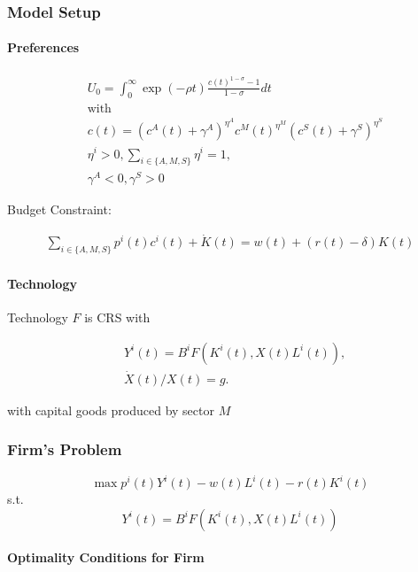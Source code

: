 \documentclass[10pt]{article}
\begin{document}
\subsubsection{Model Setup}

\paragraph{Preferences}

\begin{align}
    &U_0=\int_0^{\infty} \exp (-\rho t) \frac{c(t)^{1-\sigma}-1}{1-\sigma} d t \\
    &\text{with} \\
    &c(t)=\left(c^A(t)+\gamma^A\right)^{\eta^A} c^M(t)^{\eta^M}\left(c^S(t)+\gamma^S\right)^{\eta^S} \\
    &\eta^i  >0, \sum_{i \in\{A, M, S\}} \eta^i=1, \\
    &\gamma^A  <0, \gamma^S>0
\end{align}

Budget Constraint:

\begin{align}
    \sum_{i \in\{A, M, S\}} p^i(t) c^i(t)+\dot{K}(t)=w(t)+(r(t)-\delta) K(t)
\end{align}

\paragraph{Technology}

Technology $F$ is CRS with

\begin{align}
    &Y^i(t) =B^i F\left(K^i(t), X(t) L^i(t)\right), \\
    &\dot{X}(t) / X(t) =g .
\end{align}

with capital goods produced by sector $M$

\subsubsection{Firm's Problem}

$$
\max p^i(t) Y^i(t)-w(t) L^i(t)-r(t) K^i(t)
$$
s.t.
$$
Y^i(t)=B^i F\left(K^i(t), X(t) L^i(t)\right)
$$

\paragraph{Optimality Conditions for Firm}
\end{document}
